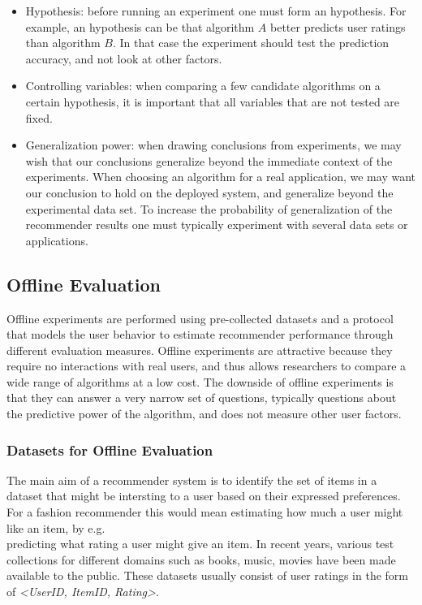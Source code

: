 \begin{itemize}

\item Hypothesis: before running an experiment one must form an hypothesis. For
	example, an hypothesis can be that algorithm $A$ better predicts user ratings
	than algorithm $B$. In that case the experiment should test the prediction
	accuracy, and not look at other factors.

\item Controlling variables: when comparing a few candidate algorithms on a
	certain hypothesis, it is important that all variables that are not tested
	are fixed.

\item Generalization power: when drawing conclusions from experiments, we may
	wish that our conclusions generalize beyond the immediate context of the
	experiments. When choosing an algorithm for a real application, we may want
	our conclusion to hold on the deployed system, and generalize beyond the
	experimental data set. To increase the probability of generalization of the
	recommender results one must typically experiment with several data sets or
	applications.

\end{itemize}


\subsection{Offline Evaluation}

Offline experiments are performed using pre-collected dataset\(s\) and a protocol
that models the user behavior to estimate recommender performance through
different evaluation measures. Offline experiments are attractive because they
require no interactions with real users, and thus allows researchers to compare
a wide range of algorithms at a low cost. The downside of offline experiments
is that they can answer a very narrow set of questions, typically questions
about the predictive power of the algorithm, and does not measure other user
factors.

\subsubsection{Datasets for Offline Evaluation}

The main aim of a recommender system is to identify the set of items in a
dataset that might be intersting to a user based on their expressed
preferences. For a fashion recommender this would mean estimating how much a
user might like an item, by e.g.\\ predicting what rating a user might give an
item. In recent years, various test collections for different domains such as
books, music, movies have been made available to the public. These datasets
usually consist of user ratings in the form of \emph{<UserID, ItemID, Rating>}.

